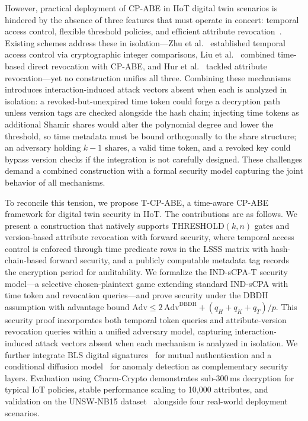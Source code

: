 ﻿\documentclass[lettersize,journal]{IEEEtran}
\begin{document}
However, practical deployment of CP-ABE in IIoT digital twin scenarios is
hindered by the absence of three features that must operate in concert:
temporal access control, flexible threshold policies, and efficient attribute
revocation~\cite{Li2022_CPABE_Survey, Iqal2024,
Aouedi2025_IoTSurvey, Sharma2026_IoTSecurity}. Existing schemes
address these in isolation---Zhu et al.~\cite{Zhu2012} established temporal
access control via cryptographic integer comparisons, Liu et
al.~\cite{Liu2018_ACNS} combined time-based direct revocation with CP-ABE,
and Hur et al.~\cite{Hur2011} tackled attribute revocation---yet no
construction unifies all three. Combining these mechanisms introduces
interaction-induced attack vectors absent when each is analyzed in isolation:
a revoked-but-unexpired time token could forge a decryption path unless
version tags are checked alongside the hash chain; injecting time tokens as
additional Shamir shares would alter the polynomial degree and lower the
threshold, so time metadata must be bound orthogonally to the share structure;
an adversary holding $k{-}1$ shares, a valid time token, and a revoked key
could bypass version checks if the integration is not carefully designed.
These challenges demand a combined construction with a formal security model
capturing the joint behavior of all mechanisms.

To reconcile this tension, we propose T-CP-ABE, a time-aware CP-ABE framework
for digital twin security in IIoT. The contributions are as follows. We
present a construction that natively supports THRESHOLD$(k,n)$ gates and
version-based attribute revocation with forward security, where temporal
access control is enforced through time predicate rows in the LSSS matrix
with hash-chain-based forward security, and a publicly computable metadata
tag records the encryption period for auditability. We formalize the
IND-sCPA-T security model---a selective chosen-plaintext game extending
standard IND-sCPA with time token and revocation queries---and prove
security under the DBDH assumption with advantage bound $\text{Adv} \leq
2\,\text{Adv}^{\text{DBDH}} + (q_H + q_K + q_T)/p$. This security proof
incorporates both temporal token queries
and attribute-version revocation queries within a unified adversary
model, capturing interaction-induced attack vectors absent when each
mechanism is analyzed in isolation. We further integrate BLS
digital signatures~\cite{Burgos2024} for mutual authentication and
a conditional diffusion model~\cite{Tang2023, TabDDPM2023, Ho2020_DDPM} for
anomaly detection as complementary security layers. Evaluation
using Charm-Crypto demonstrates sub-300\,ms decryption for
typical IoT policies, stable performance scaling to 10,000 attributes, and
validation on the UNSW-NB15 dataset~\cite{Zoghi2024}
alongside four real-world deployment scenarios.
\end{document}
